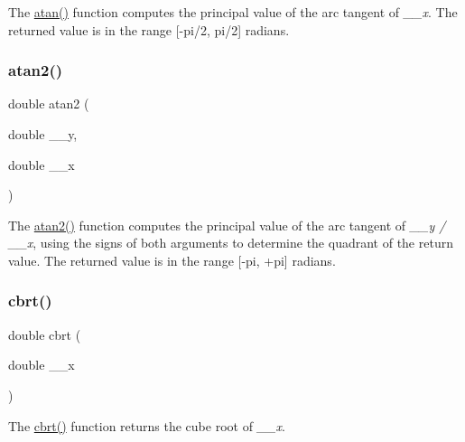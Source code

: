 The \hyperlink{group__avr__math_ga91781e24e088dac3595e3fee50fcfb6d}{atan()} function computes the principal value of the arc tangent of {\itshape \+\_\+\+\_\+x}. The returned value is in the range \mbox{[}-\/pi/2, pi/2\mbox{]} radians. \mbox{\label{group__avr__math_ga1282adc3f67ff1b7ed9bdeef3e7b1ab6}} 
\subsubsection{\texorpdfstring{atan2()}{atan2()}}
{\footnotesize\ttfamily double atan2 (\begin{DoxyParamCaption}\item[{double}]{\+\_\+\+\_\+y,  }\item[{double}]{\+\_\+\+\_\+x }\end{DoxyParamCaption})}

The \hyperlink{group__avr__math_ga1282adc3f67ff1b7ed9bdeef3e7b1ab6}{atan2()} function computes the principal value of the arc tangent of {\itshape \+\_\+\+\_\+y / \+\_\+\+\_\+x}, using the signs of both arguments to determine the quadrant of the return value. The returned value is in the range \mbox{[}-\/pi, +pi\mbox{]} radians. \mbox{\label{group__avr__math_ga10e79401a84266cc52fed672a8bb4a41}} 
\subsubsection{\texorpdfstring{cbrt()}{cbrt()}}
{\footnotesize\ttfamily double cbrt (\begin{DoxyParamCaption}\item[{double}]{\+\_\+\+\_\+x }\end{DoxyParamCaption})}

The \hyperlink{group__avr__math_ga10e79401a84266cc52fed672a8bb4a41}{cbrt()} function returns the cube root of {\itshape \+\_\+\+\_\+x}. \mbox{\label{group__avr__math_gaf3602dd198f88f5a571f62936fd6b5cc}} 
